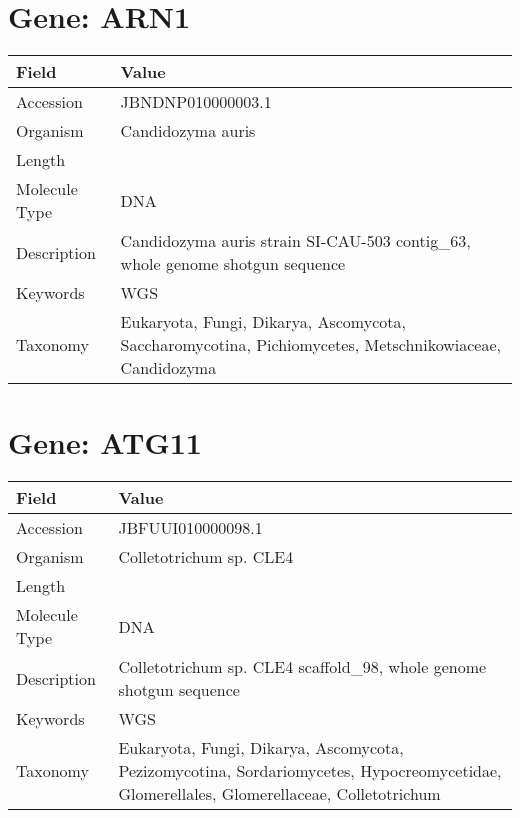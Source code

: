 \documentclass[10pt]{article}
\begin{document}
\vspace{1em}
\section{Gene: ARN1}
{\footnotesize
\begin{longtable}{>{\raggedright\arraybackslash}p{4.5cm} >{\raggedright\arraybackslash}p{11.5cm}}
\textbf{Field} & \textbf{Value} \\
\hline
Accession & JBNDNP010000003.1 \\
Organism & Candidozyma auris \\
Length & 776716 \\
Molecule Type & DNA \\
Description & Candidozyma auris strain SI-CAU-503 contig\_63, whole genome shotgun sequence \\
Keywords & WGS \\
Taxonomy & Eukaryota, Fungi, Dikarya, Ascomycota, Saccharomycotina, Pichiomycetes, Metschnikowiaceae, Candidozyma \\
\end{longtable}
}

\vspace{1em}
\section{Gene: ATG11}
{\footnotesize
\begin{longtable}{>{\raggedright\arraybackslash}p{4.5cm} >{\raggedright\arraybackslash}p{11.5cm}}
\textbf{Field} & \textbf{Value} \\
\hline
Accession & JBFUUI010000098.1 \\
Organism & Colletotrichum sp. CLE4 \\
Length & 135609 \\
Molecule Type & DNA \\
Description & Colletotrichum sp. CLE4 scaffold\_98, whole genome shotgun sequence \\
Keywords & WGS \\
Taxonomy & Eukaryota, Fungi, Dikarya, Ascomycota, Pezizomycotina, Sordariomycetes, Hypocreomycetidae, Glomerellales, Glomerellaceae, Colletotrichum \\
\end{longtable}
}

\vspace{1em}
\end{document}
